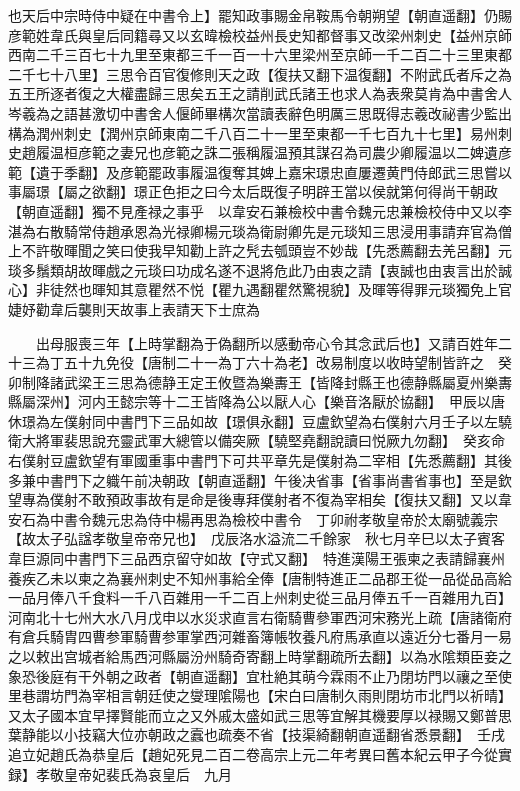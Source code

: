 也天后中宗時侍中疑在中書令上】罷知政事賜金帛鞍馬令朝朔望【朝直遥翻】仍賜彦範姓韋氏與皇后同籍尋又以玄暐檢校益州長史知都督事又改梁州刺史【益州京師西南二千三百七十九里至東都三千一百一十六里梁州至京師一千二百二十三里東都二千七十八里】三思令百官復修則天之政【復扶又翻下温復翻】不附武氏者斥之為五王所逐者復之大權盡歸三思矣五王之請削武氏諸王也求人為表衆莫肯為中書舍人岑羲為之語甚激切中書舍人偃師畢構次當讀表辭色明厲三思既得志羲改祕書少監出構為潤州刺史【潤州京師東南二千八百二十一里至東都一千七百九十七里】易州刺史趙履温桓彦範之妻兄也彦範之誅二張稱履温預其謀召為司農少卿履温以二婢遺彦範【遺于季翻】及彦範罷政事履温復奪其婢上嘉宋璟忠直屢遷黄門侍郎武三思嘗以事屬璟【屬之欲翻】璟正色拒之曰今太后既復子明辟王當以侯就第何得尚干朝政【朝直遥翻】獨不見產禄之事乎　以韋安石兼檢校中書令魏元忠兼檢校侍中又以李湛為右散騎常侍趙承恩為光禄卿楊元琰為衛尉卿先是元琰知三思浸用事請弃官為僧上不許敬暉聞之笑曰使我早知勸上許之髠去瓠頭豈不妙哉【先悉薦翻去羌呂翻】元琰多鬚類胡故暉戲之元琰曰功成名遂不退將危此乃由衷之請【衷誠也由衷言出於誠心】非徒然也暉知其意瞿然不悦【瞿九遇翻瞿然驚視貌】及暉等得罪元琰獨免上官婕妤勸韋后襲則天故事上表請天下士庶為

　　出母服喪三年【上時掌翻為于偽翻所以感動帝心令其念武后也】又請百姓年二十三為丁五十九免役【唐制二十一為丁六十為老】改易制度以收時望制皆許之　癸卯制降諸武梁王三思為德静王定王攸暨為樂夀王【皆降封縣王也德静縣屬夏州樂夀縣屬深州】河内王懿宗等十二王皆降為公以厭人心【樂音洛厭於協翻】　甲辰以唐休璟為左僕射同中書門下三品如故【璟俱永翻】豆盧欽望為右僕射六月壬子以左驍衛大將軍裴思說充靈武軍大總管以備突厥【驍堅堯翻說讀曰悦厥九勿翻】　癸亥命右僕射豆盧欽望有軍國重事中書門下可共平章先是僕射為二宰相【先悉薦翻】其後多兼中書門下之軄午前决朝政【朝直遥翻】午後决省事【省事尚書省事也】至是欽望專為僕射不敢預政事故有是命是後專拜僕射者不復為宰相矣【復扶又翻】又以韋安石為中書令魏元忠為侍中楊再思為檢校中書令　丁卯祔孝敬皇帝於太廟號義宗【故太子弘諡孝敬皇帝帝兄也】　戊辰洛水溢流二千餘家　秋七月辛巳以太子賓客韋巨源同中書門下三品西京留守如故【守式又翻】　特進漢陽王張柬之表請歸襄州養疾乙未以柬之為襄州刺史不知州事給全俸【唐制特進正二品郡王從一品從品高給一品月俸八千食料一千八百雜用一千二百上州刺史從三品月俸五千一百雜用九百】　河南北十七州大水八月戊申以水災求直言右衛騎曹參軍西河宋務光上疏【唐諸衛府有倉兵騎胄四曹参軍騎曹参軍掌西河雜畜簿帳牧養凡府馬承直以遠近分七番月一易之以敕出宫城者給馬西河縣屬汾州騎奇寄翻上時掌翻疏所去翻】以為水隂類臣妾之象恐後庭有干外朝之政者【朝直遥翻】宜杜絶其萌今霖雨不止乃閉坊門以禳之至使里巷謂坊門為宰相言朝廷使之燮理隂陽也【宋白曰唐制久雨則閉坊市北門以祈晴】又太子國本宜早擇賢能而立之又外戚太盛如武三思等宜解其機要厚以禄賜又鄭普思葉静能以小技竊大位亦朝政之蠧也疏奏不省【技渠綺翻朝直遥翻省悉景翻】　壬戌追立妃趙氏為恭皇后【趙妃死見二百二卷高宗上元二年考異曰舊本紀云甲子今從實録】孝敬皇帝妃裴氏為哀皇后　九月

